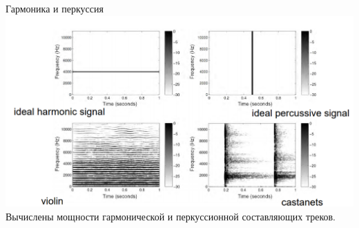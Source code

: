 \documentclass[c, aspectratio = 43]{beamer}
\begin{document}
\begin{frame}{Гармоника и перкуссия}
\includegraphics[width=\linewidth]{hp.png}
\vfill
Вычислены мощности гармонической и перкуссионной составляющих треков.
\end{frame}
\end{document}
